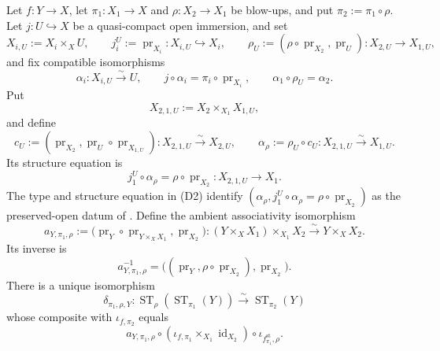 \begin{lemma}
  \label{lemma:nagata-strict-transform-dominating}

  Let $f\colon Y\to X$, let $\pi_1\colon X_1\to X$ and
  $\rho\colon X_2\to X_1$ be blow-ups, and put
  $\pi_2:=\pi_1\circ\rho$.  Let $j\colon U\hookrightarrow X$ be a
  quasi-compact open immersion, and set
  \[
    X_{i,U}:=X_i\times_XU,\qquad
    j_i^U:=\operatorname{pr}_{X_i}\colon X_{i,U}\hookrightarrow X_i,\qquad
    \rho_U:=(\rho\circ\operatorname{pr}_{X_2},\operatorname{pr}_U)
      \colon X_{2,U}\to X_{1,U},
  \]
  and fix compatible isomorphisms
  \[
    \alpha_i\colon X_{i,U}\xrightarrow{\sim}U,\qquad
    j\circ\alpha_i=\pi_i\circ\operatorname{pr}_{X_i},\qquad
    \alpha_1\circ\rho_U=\alpha_2.                                 \tag{D1}
  \]
  Put
  \[
    X_{2,1,U}:=X_2\times_{X_1}X_{1,U},
  \]
  and define
  \[
    c_U:=(\operatorname{pr}_{X_2},
      \operatorname{pr}_U\circ\operatorname{pr}_{X_{1,U}})
      \colon X_{2,1,U}\xrightarrow{\sim}X_{2,U},
    \qquad
    \alpha_\rho:=\rho_U\circ c_U
      \colon X_{2,1,U}\xrightarrow{\sim}X_{1,U}.                 \tag{D2}
  \]
  Its structure equation is
  \[
    j_1^U\circ\alpha_\rho
      =\rho\circ\operatorname{pr}_{X_2}\colon X_{2,1,U}\to X_1.
  \]
  The type and structure equation in (D2) identify
  $(\alpha_\rho,j_1^U\circ\alpha_\rho
    =\rho\circ\operatorname{pr}_{X_2})$
  as the preserved-open datum of
  .  Define the ambient associativity
  isomorphism
  \[
    a_{Y,\pi_1,\rho}:=
      \bigl(
        \operatorname{pr}_Y\circ\operatorname{pr}_{Y\times_XX_1},
        \operatorname{pr}_{X_2}
      \bigr)
      \colon (Y\times_XX_1)\times_{X_1}X_2
        \xrightarrow{\sim}Y\times_XX_2.                           \tag{D3}
  \]
  Its inverse is
  \[
    a_{Y,\pi_1,\rho}^{-1}
      =\bigl(
          (\operatorname{pr}_Y,\rho\circ\operatorname{pr}_{X_2}),
          \operatorname{pr}_{X_2}
        \bigr).
  \]
  There is a unique isomorphism
  \[
    \delta_{\pi_1,\rho,Y}\colon
      \operatorname{ST}_{\rho}(\operatorname{ST}_{\pi_1}(Y))
      \xrightarrow{\sim}\operatorname{ST}_{\pi_2}(Y)             \tag{D4}
  \]
  whose composite with $\iota_{f,\pi_2}$ equals
  \[
    a_{Y,\pi_1,\rho}\circ
      (\iota_{f,\pi_1}\times_{X_1}\operatorname{id}_{X_2})\circ
      \iota_{f^{\mathrm{st}}_{\pi_1},\rho}.                       \tag{D5}
  \]
\end{lemma}

